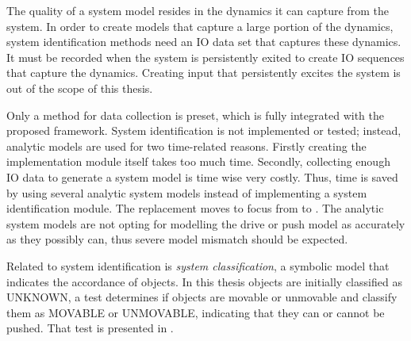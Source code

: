The quality of a system model resides in the dynamics it can capture from the system. In order to create models that capture a large portion of the dynamics, system identification methods need an \ac{IO} data set that captures these dynamics. It must be recorded when the system is persistently exited to create \ac{IO} sequences that capture the dynamics. Creating input that persistently excites the system is out of the scope of this thesis.\bs

Only a method for data collection is preset, which is fully integrated with the proposed framework. System identification is not implemented or tested; instead, analytic models are used for two time-related reasons. Firstly creating the implementation module itself takes too much time. Secondly, collecting enough \ac{IO} data to generate a system model is time wise very costly. Thus, time is saved by using several analytic system models instead of implementing a system identification module. The replacement moves to focus from  to . The analytic system models are not opting for modelling the drive or push model as accurately as they possibly can, thus severe model mismatch should be expected.\bs

Related to system identification is \textit{system classification}, a symbolic model that indicates the accordance of objects. In this thesis objects are initially classified as UNKNOWN, a test determines if objects are movable or unmovable and classify them as MOVABLE or UNMOVABLE, indicating that they can or cannot be pushed. That test is presented in .\bs
